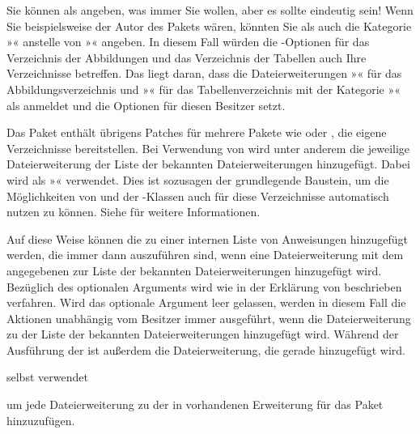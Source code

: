 Sie können als  angeben, was immer Sie wollen, aber es sollte
eindeutig sein! Wenn Sie beispielsweise der Autor des Pakets 
wären, könnten Sie als  auch die Kategorie »«
anstelle von »« angeben. In diesem Fall würden die
\KOMAScript-Optionen%
 für das Verzeichnis der Abbildungen
und das Verzeichnis der Tabellen auch Ihre Verzeichnisse betreffen. Das liegt
daran, dass \KOMAScript{} die Dateierweiterungen »« für das
Abbildungsverzeichnis und »« für das Tabellenverzeichnis mit der
Kategorie »« als  anmeldet und die Optionen für
diesen Besitzer setzt.

Das Paket
\href{https://www.ctan.org/pkg/scrhack}{}{}%
%
 enthält
übrigens Patches für mehrere Pakete wie 
oder , die eigene Verzeichnisse
bereitstellen. Bei Verwendung von
\href{https://www.ctan.org/pkg/scrhack}{} wird unter anderem
die jeweilige Dateierweiterung der Liste der bekannten Dateierweiterungen
hinzugefügt. Dabei wird als  »« verwendet. Dies
ist sozusagen der grundlegende Baustein, um die Möglichkeiten von
 und der \KOMAScript-Klassen auch für diese Verzeichnisse
automatisch nutzen zu können. Siehe \cite{pkg:scrhack:manual} für weitere
Informationen.%
\EndIndexGroup


\begin{Declaration}
\end{Declaration}
Auf diese Weise können die  zu einer internen Liste von
Anweisungen hinzugefügt werden, die immer dann auszuführen sind, wenn eine
Dateierweiterung mit dem angegebenen  zur Liste der bekannten
Dateierweiterungen hinzugefügt wird. Bezüglich des optionalen Arguments wird
wie in der Erklärung von  beschrieben
verfahren. Wird das optionale Argument leer gelassen, werden in diesem Fall
die Aktionen unabhängig vom Besitzer immer ausgeführt, wenn die
Dateierweiterung zu der Liste der bekannten Dateierweiterungen hinzugefügt
wird. Während der Ausführung der  ist außerdem
 die
Dateierweiterung, die gerade hinzugefügt wird.
\begin{Example}
   selbst verwendet
\begin{lstcode}
  \AtAddToTocList[]{%
    \expandafter\tocbasic@extend@babel
    \expandafter{\@currext}}
\end{lstcode}
  um jede Dateierweiterung zu der in  vorhandenen
  Erweiterung für das Paket  hinzuzufügen.
\end{Example}

